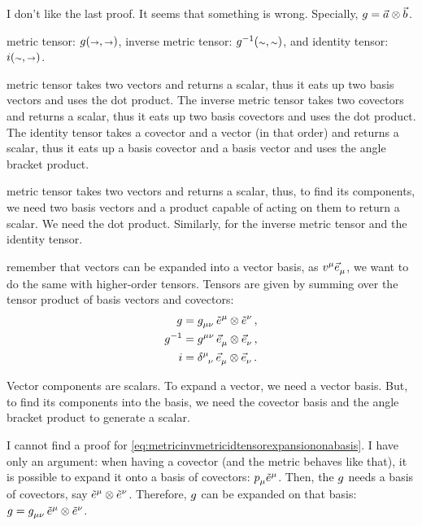  I don't like the last proof. It seems that something is wrong. Specially, $g = \vec a\otimes\vec b$.

 metric tensor: $\metric\vat{\vslot,\vslot}$, inverse metric tensor: $\invmet\vat{\cslot,\cslot}$, and identity tensor: $\idtens\vat{\cslot,\vslot}$.

 metric tensor takes two vectors and returns a scalar, thus it eats up two basis vectors and uses the dot product. The inverse metric tensor takes two covectors and returns a scalar, thus it eats up two basis covectors and uses the dot product. The identity tensor takes a covector and a vector (in that order) and returns a scalar, thus it eats up a basis covector and a basis vector and uses the angle bracket product.

 metric tensor takes two vectors and returns a scalar, thus, to find its components, we need two basis vectors and a product capable of acting on them to return a scalar. We need the dot product. Similarly, for the inverse metric tensor and the identity tensor.

 remember that vectors can be expanded into a vector basis, as $\tvec v\mu\tbvec\mu$, we want to do the same with higher-order tensors. Tensors are given by summing over the tensor product of basis vectors and covectors:
%
\begin{align}\label{eq:metricinvmetricidtensorexpansiononabasis}
  \metric &= \tmetric\mu\nu\,\tbcov\mu\tprod\tbcov\nu \,,\\\nonumber
  \invmet &= \tinvmet\mu\nu\,\tbvec\mu\tprod\tbvec\nu \,,\\\nonumber
  \idtens &= \tkron\mu\nu  \,\tbvec\mu\tprod\tbvec\nu   \,.\nonumber
\end{align}

 Vector components are scalars. To expand a vector, we need a vector basis. But, to find its components into the basis, we need the covector basis and the angle bracket product to generate a scalar.

 I cannot find a proof for \cref{eq:metricinvmetricidtensorexpansiononabasis}. I have only an argument: when having a covector (and the metric behaves like that), it is possible to expand it onto a basis of covectors: $\tcov p\mu\tbcov\mu$. Then, the $g$ needs a basis of covectors, say $\tbcov\mu\tprod\tbcov\nu$. Therefore, $g$ can be expanded on that basis: $\metric = \tmetric\mu\nu\,\tbcov\mu\tprod\tbcov\nu$.

